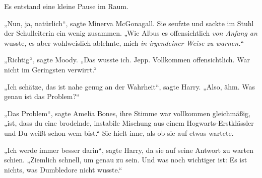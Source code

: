 Es entstand eine kleine Pause im Raum.

„Nun, ja, natürlich“, sagte Minerva McGonagall.
Sie seufzte und sackte im Stuhl der Schulleiterin ein wenig zusammen.
„Wie Albus es offensichtlich \emph{von Anfang an} wusste, es aber wohlweislich ablehnte, mich \emph{in irgendeiner Weise zu warnen.}“

„Richtig“, sagte Moody. „Das wusste ich. Jepp. Vollkommen offensichtlich. War nicht im Geringsten verwirrt.“

„Ich schätze, das ist nahe genug an der Wahrheit“, sagte Harry. „Also, ähm. Was genau ist das Problem?“

„Das Problem“, sagte Amelia Bones, ihre Stimme war vollkommen gleichmäßig, „ist, dass du eine brodelnde, instabile Mischung aus einem Hogwarts-Erstklässler und Du-weißt-schon-wem bist.“
Sie hielt inne, als ob sie auf etwas wartete.

„Ich werde immer besser darin“, sagte Harry, da sie auf seine Antwort zu warten schien. „Ziemlich schnell, um genau zu sein. Und was noch wichtiger ist: Es ist nichts, was Dumbledore nicht wusste.“

